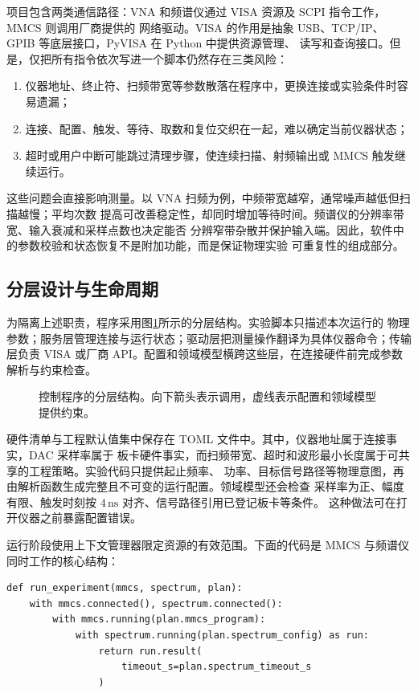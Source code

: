 \documentclass[UTF8,zihao=-4,a4paper]{ctexart}
\begin{document}
项目包含两类通信路径：VNA 和频谱仪通过 VISA 资源及 SCPI 指令工作，MMCS 则调用厂商提供的
网络驱动。VISA 的作用是抽象 USB、TCP/IP、GPIB 等底层接口，PyVISA 在 Python 中提供资源管理、
读写和查询接口\cite{grecco2023}。但是，仅把所有指令依次写进一个脚本仍然存在三类风险：

\begin{enumerate}
  \item 仪器地址、终止符、扫频带宽等参数散落在程序中，更换连接或实验条件时容易遗漏；
  \item 连接、配置、触发、等待、取数和复位交织在一起，难以确定当前仪器状态；
  \item 超时或用户中断可能跳过清理步骤，使连续扫描、射频输出或 MMCS 触发继续运行。
\end{enumerate}

这些问题会直接影响测量。以 VNA 扫频为例，中频带宽越窄，通常噪声越低但扫描越慢；平均次数
提高可改善稳定性，却同时增加等待时间。频谱仪的分辨率带宽、输入衰减和采样点数也决定能否
分辨窄带杂散并保护输入端。因此，软件中的参数校验和状态恢复不是附加功能，而是保证物理实验
可重复性的组成部分。

\subsection{分层设计与生命周期}

为隔离上述职责，程序采用图\ref{fig:architecture}所示的分层结构。实验脚本只描述本次运行的
物理参数；服务层管理连接与运行状态；驱动层把测量操作翻译为具体仪器命令；传输层负责 VISA
或厂商 API。配置和领域模型横跨这些层，在连接硬件前完成参数解析与约束检查。

\begin{figure}[htbp]
  \centering
  \resizebox{0.94\linewidth}{!}{}
  \caption{控制程序的分层结构。向下箭头表示调用，虚线表示配置和领域模型提供约束。}
  \label{fig:architecture}
\end{figure}

硬件清单与工程默认值集中保存在 TOML 文件中。其中，仪器地址属于连接事实，DAC 采样率属于
板卡硬件事实，而扫频带宽、超时和波形最小长度属于可共享的工程策略。实验代码只提供起止频率、
功率、目标信号路径等物理意图，再由解析函数生成完整且不可变的运行配置。领域模型还会检查
采样率为正、幅度有限、触发时刻按 $4\,\mathrm{ns}$ 对齐、信号路径引用已登记板卡等条件。
这种做法可在打开仪器之前暴露配置错误。

运行阶段使用上下文管理器限定资源的有效范围。下面的代码是 MMCS 与频谱仪同时工作的核心结构：

\begin{lstlisting}[caption={多仪器运行及确定性清理},label={lst:lifecycle}]
def run_experiment(mmcs, spectrum, plan):
    with mmcs.connected(), spectrum.connected():
        with mmcs.running(plan.mmcs_program):
            with spectrum.running(plan.spectrum_config) as run:
                return run.result(
                    timeout_s=plan.spectrum_timeout_s
                )
\end{lstlisting}
\end{document}
